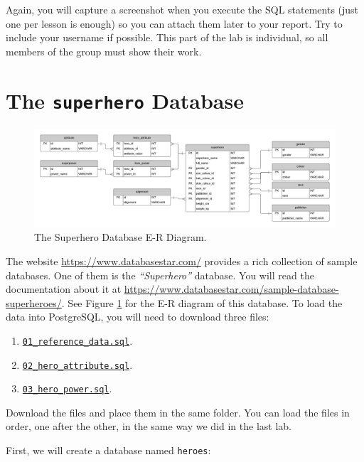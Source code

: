 \documentclass{article}
\begin{document}
Again, you will capture a screenshot when you execute the SQL statements (just one per lesson is enough) so you can attach them later to your report. Try to include your username if possible. This part of the lab is individual, so all members of the group must show their work.

\section{The \texttt{superhero} Database}

\begin{figure}[t]
 \centering
 \includegraphics[width=\textwidth]{figures/erd}
 \caption{The Superhero Database E-R Diagram.}
 \label{fig:erd}
\end{figure}

The website \url{https://www.databasestar.com/} provides a rich collection of sample databases. One of them is the \textit{``Superhero''} database. You will read the documentation about it at \url{https://www.databasestar.com/sample-database-superheroes/}. See Figure \ref{fig:erd} for the E-R diagram of this database. To load the data into PostgreSQL, you will need to download three files:

\begin{enumerate}
  \item \href{https://drive.google.com/file/d/117RF0tbGk4LHhpcnBGr13Jl7C7GdUaB4/view?usp=drive_link}{\texttt{01\_reference\_data.sql}}.
  \item \href{https://drive.google.com/file/d/1j7lT45SjCtCo2Hc1fP5ej-Uopl0V1ZJR/view?usp=drive_link}{\texttt{02\_hero\_attribute.sql}}.
  \item \href{https://drive.google.com/file/d/1cV0cqxUjbCV1k67CPb-9wYkS_ymcF4Kq/view?usp=drive_link}{\texttt{03\_hero\_power.sql}}.
\end{enumerate}

Download the files and place them in the same folder. You can load the files in order, one after the other, in the same way we did in the last lab.

First, we will create a database named \texttt{heroes}:
\end{document}
